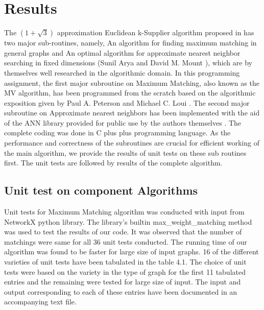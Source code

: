 \documentclass[12pt, a4paper]{article}
\begin{document}
\section{Results}
The $(1+\sqrt{3})$ approximation Euclidean k-Supplier algorithm proposed in \cite{EuclideanKS} has two major sub-routines, namely, An algorithm for ﬁnding maximum matching in general graphs \cite{MicaliVazirani} and An optimal algorithm for approximate nearest neighbor searching in ﬁxed dimensions  (Sunil Arya and David M. Mount \cite{ANN}), which are by themselves well researched in the algorithmic domain. In this programming assignment, the first major subroutine on Maximum Matching, also known as the MV algorithm, has been programmed from the scratch based on the algorithmic exposition given by Paul A. Peterson and Michael C. Loui \cite{Exposition}. The second major subroutine on Approximate nearest neighbors has been implemented with the aid of the ANN library provided for public use by the authors themselves \cite{ANNLibrary}. The complete coding was done in C plus plus programming language. As the performance and correctness of the subroutines are crucial for efficient working of the main algorithm, we provide the results of unit tests on these sub routines first. The unit tests are followed by results of the complete algorithm.\\
\subsection{Unit test on component Algorithms}
Unit tests for Maximum Matching algorithm was conducted with input from NetworkX python library. The library's builtin max\_weight\_matching method was used to test the results of our code. It was observed that the number of matchings were same for all 36 unit tests conducted. The running time of our algorithm was found to be faster for large size of input graphs. 16 of the different varieties of unit tests have been tabulated in the table 4.1. The choice of unit tests were based on the variety in the type of graph for the first 11 tabulated entries and the remaining were tested for large size of input. The input and output corresponding to each of these entries have been documented in an accompanying text file.
\end{document}
